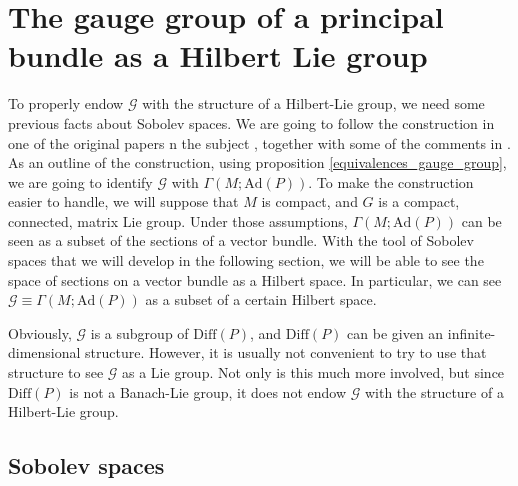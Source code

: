 \section{The gauge group of a principal bundle as a Hilbert Lie group}

To properly endow \(\mathcal{G}\) with the structure of a Hilbert-Lie group, we need some previous facts about Sobolev spaces. We are going to follow the construction in one of the original papers n the subject \parencite{mitter1981bundle}, together with some of the comments in \parencite{Rudolph_2017pug}. As an outline of the construction, using proposition \ref{equivalences_gauge_group}, we are going to identify \(\mathcal{G}\) with \(\Gamma(M; \mathrm{Ad}(P))\). To make the construction easier to handle, we will suppose that \(M\) is compact, and \(G\) is a compact, connected, matrix Lie group. Under those assumptions, \(\Gamma(M; \mathrm{Ad}(P))\) can be seen as a subset of the sections of a vector bundle. With the tool of Sobolev spaces that we will develop in the following section, we will be able to see the space of sections on a vector bundle as a Hilbert space. In particular, we can see \(\mathcal{G}\equiv \Gamma(M; \mathrm{Ad}(P))\) as a subset of a certain Hilbert space.

\begin{obs}
    Obviously, \(\mathcal{G}\) is a subgroup of \(\mathrm{Diff}(P)\), and \(\mathrm{Diff}(P)\) can be given an infinite-dimensional structure. However, it is usually not convenient to try to use that structure to see \(\mathcal{G}\) as a Lie group. Not only is this much more involved, but since \(\mathrm{Diff}(P)\) is not a Banach-Lie group, it does not endow \(\mathcal{G}\) with the structure of a Hilbert-Lie group.
\end{obs}

\subsection{Sobolev spaces}

